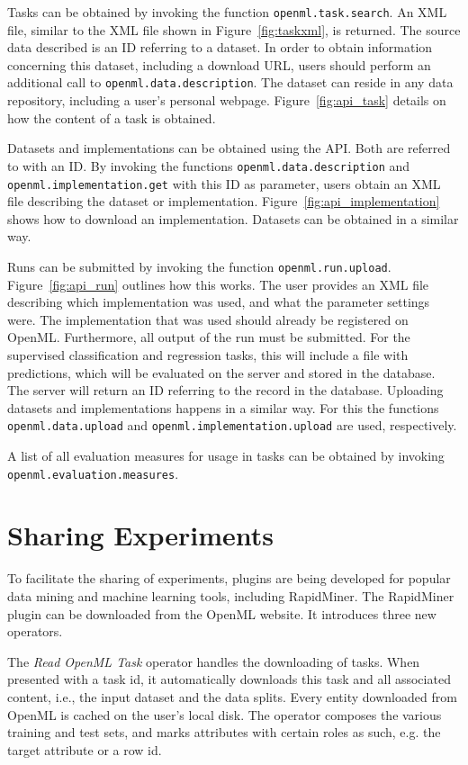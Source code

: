 \documentclass[10pt, twoside]{article}
\begin{document}
Tasks can be obtained by invoking the function \texttt{openml.task.search}. An XML file, similar to the XML file shown in Figure~\ref{fig:taskxml}, is returned. The source data described is an ID referring to a dataset. In order to obtain information concerning this dataset, including a download URL, users should perform an additional call to \texttt{openml.data.description}. The dataset can reside in any data repository, including a user's personal webpage. Figure~\ref{fig:api_task} details on how the content of a task is obtained.  

Datasets and implementations can be obtained using the API. Both are referred to with an ID. By invoking the functions \texttt{openml.data.description} and \texttt{openml.implementation.get} with this ID as parameter, users obtain an XML file describing the dataset or implementation. Figure~\ref{fig:api_implementation} shows how to download an implementation. Datasets can be obtained in a similar way. 

Runs can be submitted by invoking the function \texttt{openml.run.upload}. Figure~\ref{fig:api_run} outlines how this works. The user provides an XML file describing which implementation was used, and what the parameter settings were. The implementation that was used should already be registered on OpenML. Furthermore, all output of the run must be submitted. For the supervised classification and regression tasks, this will include a file with predictions, which will be evaluated on the server and stored in the database. The server will return an ID referring to the record in the database. Uploading datasets and implementations happens in a similar way. For this the functions \texttt{openml.data.upload} and \texttt{openml.implementation.upload} are used, respectively. 

A list of all evaluation measures for usage in tasks can be obtained by invoking \texttt{openml.evaluation.measures}. 

\section{Sharing Experiments}
\label{sec:Sharing}
To facilitate the sharing of experiments, plugins are being developed for popular data mining and machine learning tools, including RapidMiner. The RapidMiner plugin can be downloaded from the OpenML website. It introduces three new operators. 

The \emph{Read OpenML Task} operator handles the downloading of tasks. When presented with a task id, it automatically downloads this task and all associated content, i.e., the input dataset and the data splits. Every entity downloaded from OpenML is cached on the user's local disk. The operator composes the various training and test sets, and marks attributes with certain roles as such, e.g. the target attribute or a row id. 
\end{document}
